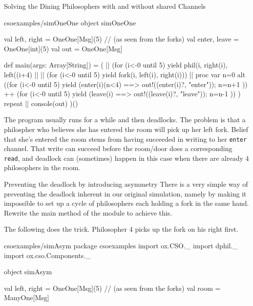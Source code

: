 \documentclass{concdistfoils}
\begin{document}
\begin{slide}
\begin{exercises}
\begin{ex**}{Solving the Dining Philosophers with and without shared Channels}
\begin{ans*}
\begin{obj}{csoexamples/simOneOne}
object simOneOne
{ val left, right   = OneOne[Msg](5) // (as seen from the forks)
  val enter, leave  = OneOne[int](5)
  val out = OneOne[Msg]
  
  def main(args: Array[String]) =
  { (  || (for (i<-0 until 5) yield phil(i, right(i),  left((i+4)%
    || || (for (i<-0 until 5) yield fork(i, left(i),   right(i)))
    || proc
       { var n=0
         alt ((for (i<-0 until 5) yield
                   (enter(i)(n<4) ==> { out!((enter(i)?, "enter")); n=n+1 })) 
             ++ 
              (for (i<-0 until 5) yield
                   (leave(i)      ==> { out!((leave(i)?, "leave")); n=n-1 })) 
             ) repeat 
       }
    || console(out)
    )()
  }   
}
\end{obj}
\end{ans*}
\begin{ans*}
The program usually runs for a while and then deadlocks. The
problem is that a philospher who believes she has entered
the room will pick up her left fork. Belief that she's
entered the room stems from having succeeded in writing to
her \texttt{enter} channel. That write can succeed before
the room/door does a corresponding \texttt{read}, and deadlock can 
(sometimes) happen in this case when there are already 4 
philosophers in the room.
\end{ans*}
\end{ex**}
\begin{ex**}{Preventing the deadlock by introducing asymmetry}
There is a very simple way of preventing the deadlock inherent
in our original simulation, namely by making it
impossible to set up a cycle of philosophers each holding
a fork in the same hand. Rewrite the main method of the  
module to achieve this. 
\begin{ans}
The following does the trick. Philosopher 4 picks up the fork on his right first.
\begin{obj}{csoexamples/simAsym}
package csoexamples
import  ox.CSO._
import  dphil._ 
import  ox.cso.Components._

object simAsym
{ val left, right  = OneOne[Msg](5) // (as seen from the forks)
  val room         = ManyOne[Msg]
  
}
\end{obj}
\end{ans}
\end{ex**}
\end{exercises}
\end{slide}
\end{document}
